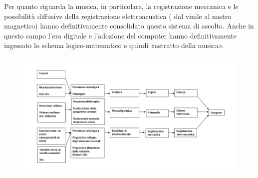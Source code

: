 Per quanto riguarda la musica, in particolare, la registrazione meccanica e le
possibilità diffusive della registrazione elettroacustica ( dal vinile al nastro
magnetico) hanno definitivamente consolidato questo sistema di ascolto.
Anche in questo campo l’era digitale e l’adozione del computer hanno
definitivamente ingessato lo schema logico-matematico e quindi «astratto della
musica».

\begin{figure}%
\centering
\includegraphics[width=0.99\columnwidth]{Graphics/foto/scheda_nuova}
\caption[]{}
\label{scheda}
\end{figure}
